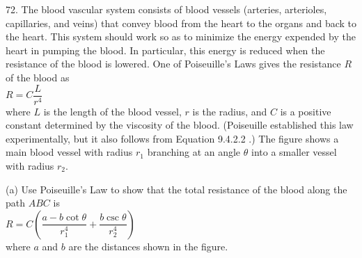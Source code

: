 \documentclass{sebase}
\begin{document}
\begin{multicols}{2}
\begin{ExerciseList}
%

%

\item[\hfill 72.] The blood vascular system consists of blood vessels
(arteries, arterioles, capillaries, and veins) that convey blood from the
heart to the organs and back to the heart. This system should work so as to
minimize the energy expended by the heart in pumping the blood. In
particular, this energy is reduced when the resistance of the blood is
lowered. One of Poiseuille's Laws gives the resistance $R$ of the blood as\\[%
6pt]
\hspace*{\fill}$R=C\dfrac{L}{r^{4}}$\hspace*{\fill}\\[6pt]
where $L$ is the length of the blood vessel, $r$ is the radius, and $C$ is a
positive constant determined by the viscosity of the blood. (Poiseuille
established this law experimentally, but it also follows from Equation 
\ifnum{} 9.4.2.2\fi%
.) The figure shows a main blood vessel with radius $r_{1}$ branching at an
angle $\theta $ into a smaller vessel with radius $r_{2}$.\\[6pt]
\hspace*{\fill}\hspace*{\fill}

\begin{ExerciseList}
\item[(a)] Use Poiseuille's Law to show that the total resistance of the
blood along the path $ABC$ is\\[6pt]
\hspace*{\fill}$R=C\left( \dfrac{a-b\cot \theta }{r_{1}^{4}}+\dfrac{b\csc
\theta }{r_{2}^{4}}\right) $\hspace*{\fill}\\[6pt]
where $a$ and $b$ are the distances shown in the figure.


\end{ExerciseList}
\end{ExerciseList}
\end{multicols}
\end{document}
